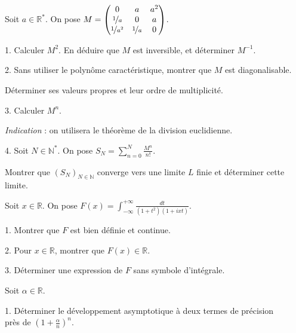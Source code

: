 \noindent Soit $a \in \mathbb{R}^*$. On pose $\displaystyle M = 
\begin{pmatrix}
0                 & a               & a^2\\
\nicefrac{1}{a}   & 0               & a  \\
\nicefrac{1}{a^2} & \nicefrac{1}{a} & 0  \\
\end{pmatrix}
$.

\vspace{5pt}
1. Calculer $M^2$. En déduire que $M$ est inversible, et déterminer $M^{-1}$.

\vspace{5pt}
2. Sans utiliser le polynôme caractéristique, montrer que $M$ est diagonalisable.

Déterminer ses valeurs propres et leur ordre de multiplicité.

\vspace{5pt}
3. Calculer $M^n$.

\textit{Indication} : on utilisera le théorème de la division euclidienne.

\vspace{5pt}
4. Soit $N \in \mathbb{N}^*$. On pose $\displaystyle S_N = \sum_{n=0}^{N} \frac{M^n}{n!}$.

Montrer que $(S_N)_{N \in \mathbb{N}}$ converge vers une limite $L$ finie et déterminer cette limite.



\subetoiles



\noindent Soit $x \in \mathbb{R}$.
On pose $\displaystyle F(x) = \int_{-\infty}^{+\infty} \frac {dt} {(1+t^2)(1+ixt)}$.

\vspace{5pt}
1. Montrer que $F$ est bien définie et continue.

\vspace{5pt}
2. Pour $x \in \mathbb{R}$, montrer que $F(x) \in \mathbb{R}$.

\vspace{5pt}
3. Déterminer une expression de $F$ sans symbole d'intégrale.



\subetoiles
\columnbreak



\noindent Soit $\alpha\in \mathbb{R}$.

\vspace{5pt}
1. Déterminer le développement asymptotique à deux termes de précision \\ près de
$\displaystyle \left( 1 + \frac {\alpha} {n}\right)^n$.

